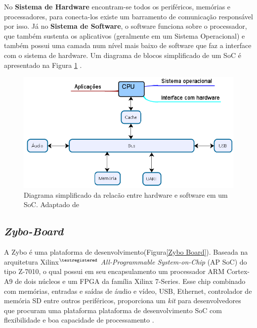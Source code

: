 No \textbf{Sistema de Hardware} encontram-se todos os periféricos, memórias e processadores, para conecta-los existe um barramento de comunicação responsável por isso. Já no \textbf{Sistema de Software}, o software funciona sobre o processador, que também sustenta os aplicativos (geralmente em um Sistema Operacional)  e também possui uma camada num nível mais baixo de software que 
faz a interface com o sistema de hardware. Um diagrama de blocos simplificado de um SoC é apresentado na Figura \ref{diagram SoC} \cite{zynqBook}.
\pagebreak

\begin{figure}[h]
	\centering
	\includegraphics[keepaspectratio=true,scale=0.5]{figuras/diaagrama-soc.png}
	\caption{Diagrama simplificado da relacão entre hardware e software em um SoC. Adaptado de \cite{cao2017post}}
	\label{diagram SoC}
\end{figure}


\subsection{\textit{Zybo-Board}}
A Zybo é uma plataforma de desenvolvimento(Figura\ref{Zybo Board}).
Baseada na arquitetura Xilinx$^{\textregistered}$ \textit{All-Programmable System-on-Chip} (AP SoC)
do tipo Z-7010, o qual possui em seu encapsulamento um processador ARM Cortex-A9 de 
dois núcleos e um FPGA da família Xilinx 7-Series. Esse chip combinado com memórias, entradas 
e saídas de áudio e vídeo, USB, Ethernet, controlador de memória SD entre outros periféricos,
proporciona um \textit{kit} para desenvolvedores que procuram uma plataforma plataforma de desenvolvimento SoC com flexibilidade e boa capacidade de processamento \cite{DigilentZybo}.  

